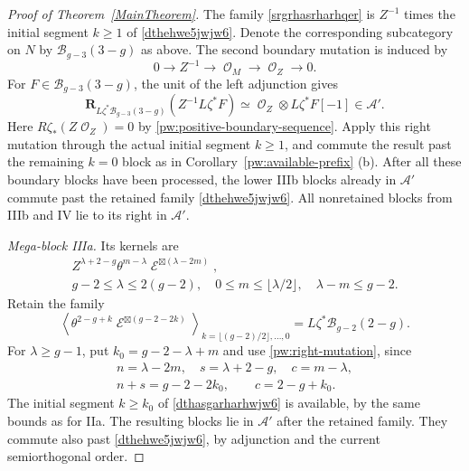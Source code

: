 \documentclass[10pt,a4paper]{amsart}
\DeclareMathOperator{\cE}{\mathcal{E}}
\DeclareMathOperator{\cO}{\mathcal{O}}
\begin{document}
\begin{proof}[Proof of Theorem~\ref{MainTheorem}]
The family \eqref{srgrhasrharhqer} is $Z^{-1}$ times the initial
segment $k\geq1$ of \eqref{dthehwe5jwjw6}.  Denote the corresponding
subcategory on $N$ by $\mathcal B_{g-3}(3-g)$ as above.  The second
boundary mutation is  induced by
\begin{equation}\label{pw:negative-boundary-sequence}
 0\longrightarrow Z^{-1}\longrightarrow\cO_M
       \longrightarrow\cO_Z\longrightarrow0.
\end{equation}
For $F\in\mathcal B_{g-3}(3-g)$, the unit of the left adjunction
gives
\begin{equation}\label{pw:negative-boundary-mutation}
 \mathbf R_{L\zeta^*\mathcal B_{g-3}(3-g)}(Z^{-1}L\zeta^*F)
       \simeq\cO_Z\otimes L\zeta^*F[-1]\in\mathcal A'.
\end{equation}
Here $R\zeta_*(Z\cO_Z)=0$ by
\eqref{pw:positive-boundary-sequence}.  Apply this right mutation
through the actual initial segment $k\geq1$, and commute the result
past the remaining $k=0$ block as in
Corollary~\ref{pw:available-prefix} (b).  After all these boundary blocks
have been processed, the lower IIIb blocks already in $\mathcal A'$
commute past the retained family \eqref{dthehwe5jwjw6}.  All
nonretained blocks from IIIb and IV lie to its right in $\mathcal A'$.

\smallskip
\noindent\textit{Mega-block IIIa.}
Its kernels are
\[
 \begin{gathered}
 Z^{\lambda+2-g}\theta^{m-\lambda}
       \cE^{\boxtimes(\lambda-2m)},\\
 g-2\leq\lambda\leq2(g-2),\quad
 0\leq m\leq\lfloor\lambda/2\rfloor,\quad\lambda-m\leq g-2.
 \end{gathered}
\]
Retain the  family
\begin{equation}\label{dthasgarharhwjw6}
 \left\langle\theta^{2-g+k}\cE^{\boxtimes(g-2-2k)}
 \right\rangle_{k=\lfloor(g-2)/2\rfloor,\ldots,0}
       =L\zeta^*\mathcal B_{g-2}(2-g).
\end{equation}
For $\lambda\geq g-1$, put $k_0=g-2-\lambda+m$ and use
\eqref{pw:right-mutation}, since
\[
 \begin{gathered}
 n=\lambda-2m,\quad s=\lambda+2-g,\quad c=m-\lambda,\\
 n+s=g-2-2k_0,\qquad c=2-g+k_0.
 \end{gathered}
\]
The initial segment $k\geq k_0$ of
\eqref{dthasgarharhwjw6} is available, by the same bounds as for IIa.
The resulting blocks lie in $\mathcal A'$ after the retained family.
They commute also past \eqref{dthehwe5jwjw6}, by adjunction and the
current semiorthogonal order.  


\end{proof}
\end{document}
